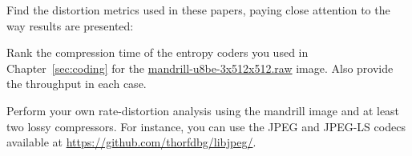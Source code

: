 \begin{exercise}
Find the distortion metrics used in these papers, paying close attention to the way results are presented:
\begin{enumerate}[label=\alph*)]
\begin{multicols}{4}
    \item \cite{auli_llinas_visuallylossless}
    \item \cite{maireles_gonzalez_astro}
    \item \cite{bartrina_ccsds}
    \item \cite{chow_k2raster}
    \item \cite{tzamarias_runlength}
    \item \cite{verdu_mijares_hyperspectral}
    \item \cite{fan_probability}
    \item \cite{veller_tans}
    \item \cite{bartrina_ccsdsreview}

  \item \cite{martin_lostsignals}
  \item \cite{zeghidour_soundstream}
  \item \cite{marpe_mpeglowcomplexity}
  \item \cite{kim_svacencoder}
  \item \cite{li_dnacompression}
  \item \cite{liu_lossyqualityvalues}
  \item \cite{huang_clusteringdna}
  \item \cite{de_moura_waveletecg}
  \item \cite{mao_ecg_lzw}
  \item \cite{rodriguez_lasvas}
  \item \cite{li_transformvvc}
\end{multicols}
\end{enumerate}

\end{exercise}

\begin{exercise}
Rank the compression time of the entropy coders you used in Chapter~\ref{sec:coding}
for the \url{mandrill-u8be-3x512x512.raw} image. Also provide the throughput in each case.
\end{exercise}

\begin{exercise}
Perform your own rate-distortion analysis using the mandrill image and at least
two lossy compressors. For instance, you can use the JPEG and JPEG-LS codecs
available at \url{https://github.com/thorfdbg/libjpeg/}.
\end{exercise}
